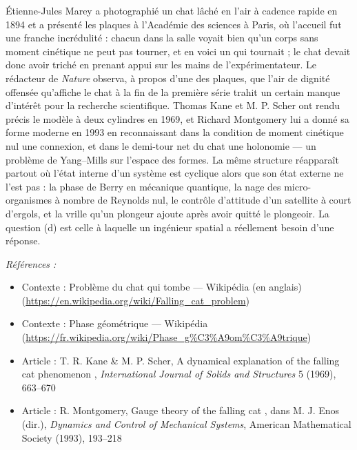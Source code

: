 \documentclass[11pt]{article}
\newenvironment{refs}{\par\small\noindent\emph{Références :}\begin{itemize}\setlength\itemsep{0pt}}{\end{itemize}\normalsize}
\begin{document}
\noindent Étienne-Jules Marey a photographié un chat lâché en l'air à cadence rapide
en 1894 et a présenté les plaques à l'Académie des sciences à Paris, où l'accueil fut une
franche incrédulité : chacun dans la salle voyait bien qu'un corps sans moment cinétique ne
peut pas tourner, et en voici un qui tournait ; le chat devait donc avoir triché en prenant
appui sur les mains de l'expérimentateur. Le rédacteur de \textit{Nature} observa, à propos
d'une des plaques, que l'air de dignité offensée qu'affiche le chat à la fin de la première
série trahit un certain manque d'intérêt pour la recherche scientifique. Thomas Kane et M. P.
Scher ont rendu précis le modèle à deux cylindres en 1969, et Richard Montgomery lui a donné
sa forme moderne en 1993 en reconnaissant dans la condition de moment cinétique nul une
connexion, et dans le demi-tour net du chat une holonomie --- un problème de Yang--Mills sur
l'espace des formes. La même structure réapparaît partout où l'état interne d'un système est
cyclique alors que son état externe ne l'est pas : la phase de Berry en mécanique quantique,
la nage des micro-organismes à nombre de Reynolds nul, le contrôle d'attitude d'un satellite
à court d'ergols, et la vrille qu'un plongeur ajoute après avoir quitté le plongeoir. La
question (d) est celle à laquelle un ingénieur spatial a réellement besoin d'une
réponse.

\begin{refs}
\item Contexte : Problème du chat qui tombe --- Wikipédia (en anglais) (\url{https://en.wikipedia.org/wiki/Falling_cat_problem})
\item Contexte : Phase géométrique --- Wikipédia (\url{https://fr.wikipedia.org/wiki/Phase_g%C3%A9om%C3%A9trique})
\item Article : T. R. Kane \& M. P. Scher, \og{} A dynamical explanation of the falling cat phenomenon \fg{}, \textit{International Journal of Solids and Structures} 5 (1969), 663--670
\item Article : R. Montgomery, \og{} Gauge theory of the falling cat \fg{}, dans M. J. Enos (dir.), \textit{Dynamics and Control of Mechanical Systems}, American Mathematical Society (1993), 193--218
\end{refs}

\bigskip
\end{document}

